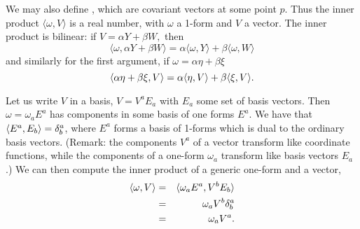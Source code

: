 \begin{defn}
We may also define , which are covariant vectors at some point $p$. Thus the inner product $\langle \omega, V\rangle$ is a real number, with $\omega$ a 1-form and $V$ a vector. The inner product is bilinear:
if $V=\alpha Y + \beta W,$ then
$$\langle \omega, \alpha Y + \beta W\rangle = \alpha\langle \omega, Y\rangle +\beta \langle \omega, W\rangle$$
and similarly for the first argument, if $\omega = \alpha \eta+\beta \xi$
$$\langle\alpha \eta +\beta\xi, V\rangle = \alpha \langle\eta, V\rangle +\beta \langle\xi, V\rangle.$$
\end{defn}

Let us write $V$ in a basis, $V=V^a E_a$ with $E_a$ some set of basis vectors. Then $\omega= \omega_a E^a$ has components in some basis of one forms $E^a$. We have that $\langle E^a, E_b\rangle=\delta^a_b$, where $E^a$ forms a basis of 1-forms which is dual to the ordinary basis vectors. (Remark: the components $V^a$ of a vector transform like coordinate functions, while the components of a one-form $\omega_a$ transform like basis vectors $E_a$.) We can then compute the inner product of a generic one-form and a vector, %
\begin{eqnarray*}
\langle\omega,V\rangle&=&\langle\omega_a E^a, V^b E_b\rangle\\
&=& \omega_a V^b \delta^a_b\\
&=& \omega_a V^a.
\end{eqnarray*}